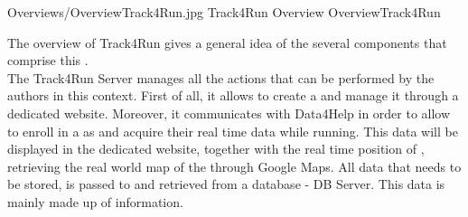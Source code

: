 \documentclass[../../DD.tex]{subfiles}
\begin{document}

	\image {13cm} {Overviews/OverviewTrack4Run.jpg} {Track4Run Overview} {OverviewTrack4Run}

	The overview of Track4Run gives a general idea of the several components that comprise this .\\
	The Track4Run Server manages all the actions that can be performed by the authors in this context. First of all, it allows  to create a  and manage it through a dedicated website. Moreover, it communicates with Data4Help in order to allow  to enroll in a  as  and acquire their real time data while running. This data will be displayed in the dedicated  website, together with the real time position of , retrieving the real world map of the  through Google Maps. All data that needs to be stored, is passed to and retrieved from a database - DB Server. This data is mainly made up of  information.

	

	
\end{document}
